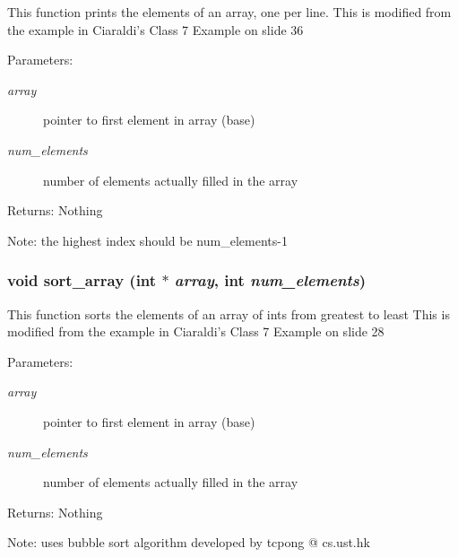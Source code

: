 This function prints the elements of an array, one per line. This is modified from the example in Ciaraldi's Class 7 Example on slide 36 \begin{Desc}
\item[Parameters:]
\begin{description}
\item[{\em array}]pointer to first element in array (base) \item[{\em num\_\-elements}]number of elements actually filled in the array \end{description}
\end{Desc}
\begin{Desc}
\item[Returns:]Nothing \end{Desc}
\begin{Desc}
\item[Note:]the highest index should be num\_\-elements-1 \end{Desc}
\subsubsection{\setlength{\rightskip}{0pt plus 5cm}void sort\_\-array (int $\ast$ {\em array}, int {\em num\_\-elements})}\label{assig3_8c_8896f0ce55dd25259e2141e714d6ef93}


This function sorts the elements of an array of ints from greatest to least This is modified from the example in Ciaraldi's Class 7 Example on slide 28 \begin{Desc}
\item[Parameters:]
\begin{description}
\item[{\em array}]pointer to first element in array (base) \item[{\em num\_\-elements}]number of elements actually filled in the array \end{description}
\end{Desc}
\begin{Desc}
\item[Returns:]Nothing \end{Desc}
\begin{Desc}
\item[Note:]uses bubble sort algorithm developed by tcpong @ cs.ust.hk \end{Desc}
